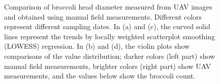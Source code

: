 \begin{figure}[htb]
  \begin{center}
  \end{center}
  \caption[Comparison of broccoli head diameter measured from UAV images and obtained using manual field measurements]{
    Comparison of broccoli head diameter measured from UAV images and obtained using manual field measurements. Different colors represent different sampling dates. 
    In (a) and (c), the curved solid lines represent the trends by locally weighted scatterplot smoothing (LOWESS) regression. 
    In (b) and (d), the violin plots show comparisons of the value distribution; 
    darker colors (left part) show manual field measurements, brighter colors (right part) show UAV measurements, and the values below show the broccoli count.
  }
  \label{fig:bro1}
\end{figure}
